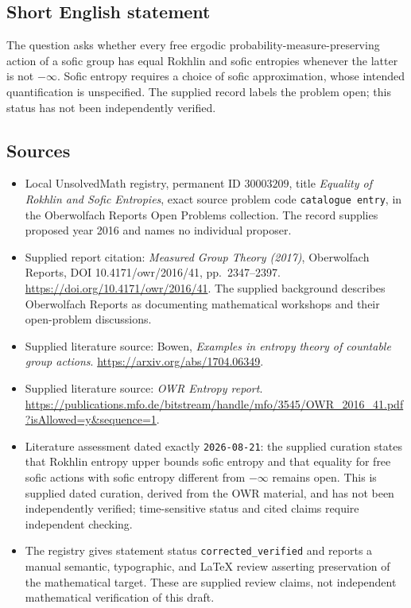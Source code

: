 \documentclass[11pt]{article}
\begin{document}
\subsection{Short English statement}
The question asks whether every free ergodic probability-measure-preserving action of a sofic group has equal Rokhlin and sofic entropies whenever the latter is not \(-\infty\). Sofic entropy requires a choice of sofic approximation, whose intended quantification is unspecified. The supplied record labels the problem open; this status has not been independently verified.
\subsection{Sources}
\begin{itemize}
\item Local UnsolvedMath registry, permanent ID \(30003209\), title \emph{Equality of Rokhlin and Sofic Entropies}, exact source problem code \texttt{catalogue entry}, in the Oberwolfach Reports Open Problems collection. The record supplies proposed year 2016 and names no individual proposer.
\item Supplied report citation: \emph{Measured Group Theory (2017)}, Oberwolfach Reports, DOI 10.4171/owr/2016/41, pp.\ 2347--2397. \url{https://doi.org/10.4171/owr/2016/41}. The supplied background describes Oberwolfach Reports as documenting mathematical workshops and their open-problem discussions.
\item Supplied literature source: Bowen, \emph{Examples in entropy theory of countable group actions}. \url{https://arxiv.org/abs/1704.06349}.
\item Supplied literature source: \emph{OWR Entropy report}. \url{https://publications.mfo.de/bitstream/handle/mfo/3545/OWR_2016_41.pdf?isAllowed=y&sequence=1}.
\item Literature assessment dated exactly \texttt{2026-08-21}: the supplied curation states that Rokhlin entropy upper bounds sofic entropy and that equality for free sofic actions with sofic entropy different from \(-\infty\) remains open. This is supplied dated curation, derived from the OWR material, and has not been independently verified; time-sensitive status and cited claims require independent checking.
\item The registry gives statement status \texttt{corrected\_verified} and reports a manual semantic, typographic, and LaTeX review asserting preservation of the mathematical target. These are supplied review claims, not independent mathematical verification of this draft.
\end{itemize}
\end{document}
